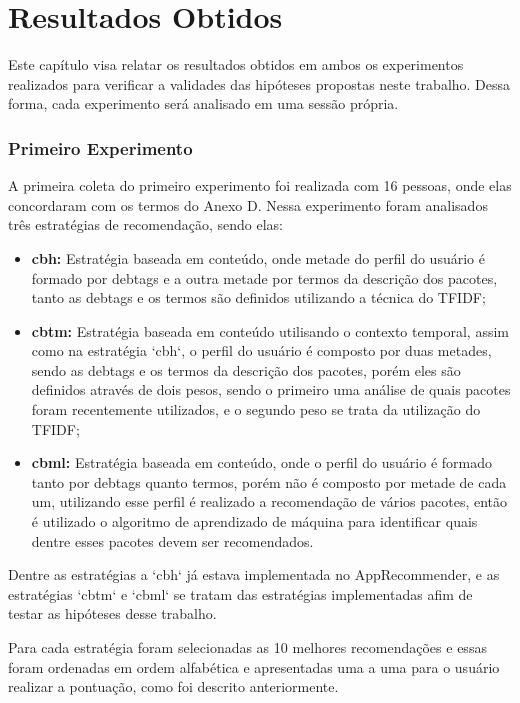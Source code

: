 \chapter[Resultados Obtidos]{Resultados Obtidos}

Este capítulo visa relatar os resultados obtidos em ambos os experimentos
realizados para verificar a validades das hipóteses propostas neste trabalho.
Dessa forma, cada experimento será analisado em uma sessão própria.

\subsection{Primeiro Experimento}

A primeira coleta do primeiro experimento foi realizada com 16 pessoas, onde
elas concordaram com os termos do Anexo D. Nessa experimento foram analisados
três estratégias de recomendação, sendo elas:

\begin{itemize}
    \item \textbf{cbh:} Estratégia baseada em conteúdo, onde metade do
    perfil do usuário é formado por debtags e a outra metade por termos
    da descrição dos pacotes, tanto as debtags e os termos são definidos
    utilizando a técnica do TFIDF;
    \item \textbf{cbtm:} Estratégia baseada em conteúdo utilisando o contexto
    temporal, assim como na estratégia `cbh`, o perfil do usuário é composto
    por duas metades, sendo as debtags e os termos da descrição dos pacotes,
    porém eles são definidos através de dois pesos, sendo o primeiro uma
    análise de quais pacotes foram recentemente utilizados, e o segundo peso
    se trata da utilização do TFIDF;
    \item \textbf{cbml:} Estratégia baseada em conteúdo, onde o perfil do
    usuário é formado tanto por debtags quanto termos, porém não é composto
    por metade de cada um, utilizando esse perfil é realizado a
    recomendação de vários pacotes, então é utilizado o algoritmo de
    aprendizado de máquina para identificar quais dentre esses pacotes
    devem ser recomendados.
\end{itemize}

Dentre as estratégias a `cbh` já estava implementada no AppRecommender, e as
estratégias `cbtm` e `cbml` se tratam das estratégias implementadas afim de
testar as hipóteses desse trabalho.

Para cada estratégia foram selecionadas as 10 melhores recomendações
e essas foram ordenadas em ordem alfabética e apresentadas uma a uma para
o usuário realizar a pontuação, como foi descrito anteriormente.

